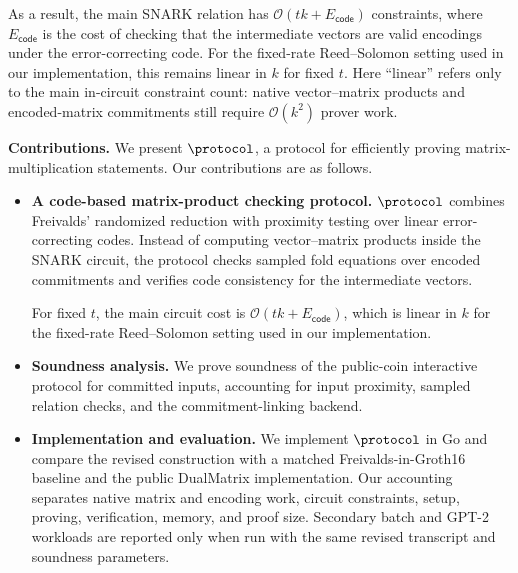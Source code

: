 As a result, the main SNARK relation has
\(\mathcal{O}(tk+E_{\mathsf{code}})\) constraints, where
\(E_{\mathsf{code}}\) is the cost of checking that the
intermediate vectors are valid encodings under the error-correcting code. For the fixed-rate Reed--Solomon setting used in our implementation,
this remains linear in \(k\) for fixed \(t\).  Here ``linear'' refers only to
the main in-circuit constraint count: native vector--matrix products and
encoded-matrix commitments still require \(\mathcal{O}(k^2)\) prover work.


\noindent\textbf{Contributions.}
We present \(\protocol\), a protocol for efficiently proving
matrix-multiplication statements.  Our contributions are as follows.
\begin{itemize}
  \item \textbf{A code-based matrix-product checking protocol.}
  \(\protocol\) combines Freivalds' randomized reduction with proximity testing
  over linear error-correcting codes.  Instead of computing vector--matrix
  products inside the SNARK circuit, the protocol checks sampled fold equations
  over encoded commitments and verifies code consistency for the intermediate
  vectors. 

  For fixed \(t\), the main circuit cost is
  \(\mathcal{O}(tk+E_{\mathsf{code}})\), which is linear in \(k\) for the
  fixed-rate Reed--Solomon setting used in our implementation.

  \item \textbf{Soundness analysis.}
  We prove soundness of the public-coin interactive protocol for committed
  inputs, accounting for input proximity, sampled relation checks, and the
  commitment-linking backend.

  \item \textbf{Implementation and evaluation.}
  We implement \(\protocol\) in Go and compare the revised construction with a
  matched Freivalds-in-Groth16 baseline and the public DualMatrix
  implementation.  Our accounting separates native matrix and encoding work,
  circuit constraints, setup, proving, verification, memory, and proof size.
  Secondary batch and GPT-2 workloads are reported only when run with the same
  revised transcript and soundness parameters.
\end{itemize}
